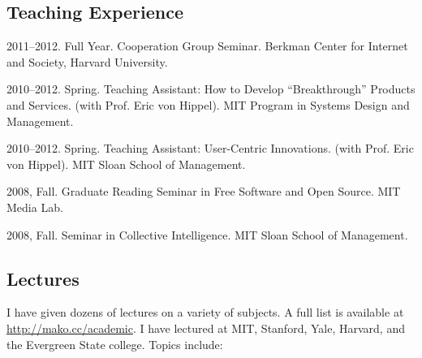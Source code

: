 \documentclass[11pt]{article}
\newenvironment{cvlist}{
\begin{list}{}{\leftmargin=3.0em \itemindent=-3.0em}
  \setlength{\itemsep}{0pt}
  \setlength{\parskip}{0em}
  \setlength{\parsep}{1em}
  \setlength{\parindent}{0em}}
{\vspace{1em}
\end{list}}
\begin{document}
\subsection{Teaching Experience}
\begin{cvlist}
\item 2011--2012. Full Year. Cooperation Group Seminar. Berkman Center
  for Internet and Society, Harvard University.
\item 2010--2012. Spring. Teaching Assistant: How to Develop ``Breakthrough''
  Products and Services. (with Prof. Eric von Hippel). MIT Program in
  Systems Design and Management.
\item 2010--2012. Spring. Teaching Assistant: User-Centric
  Innovations. (with Prof. Eric von Hippel). MIT Sloan School of
  Management.
\item 2008, Fall. Graduate Reading Seminar in Free Software and Open
  Source. MIT Media Lab.
\item 2008, Fall. Seminar in Collective Intelligence. MIT Sloan School
  of Management.
\end{cvlist}

\subsection{Lectures}

I have given dozens of lectures on a variety of subjects. A full
list is available at \url{http://mako.cc/academic}. I have lectured at
MIT, Stanford, Yale, Harvard, and the Evergreen State college. Topics
include:
\end{document}

